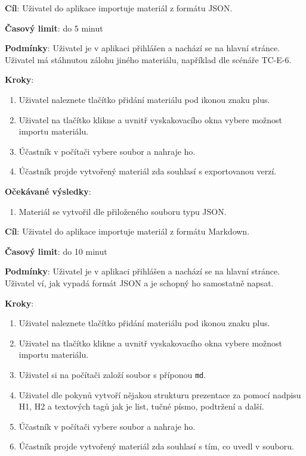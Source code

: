 \vspace{1em}

\textbf{Cíl}: Uživatel do aplikace importuje materiál z formátu JSON.

\textbf{Časový limit}: do 5 minut

\textbf{Podmínky}:  Uživatel je v aplikaci přihlášen a nachází se na hlavní stránce. Uživatel má stáhnutou zálohu jiného materiálu, například dle scénáře TC-E-6.

\textbf{Kroky}:

\begin{enumerate}[leftmargin=1.4cm]
    \item Uživatel naleznete tlačítko přidání materiálu pod ikonou znaku plus.
    \item Uživatel na tlačítko klikne a uvnitř vyskakovacího okna vybere možnost importu materiálu.
    \item Účastník v počítači vybere soubor a nahraje ho.
    \item Účastník projde vytvořený materiál zda souhlasí s exportovanou verzí.
\end{enumerate}

\textbf{Očekávané výsledky}:

\begin{enumerate}[leftmargin=1.4cm]
    \item Materiál se vytvořil dle přiloženého souboru typu JSON.
\end{enumerate}






\vspace{1em}

\textbf{Cíl}: Uživatel do aplikace importuje materiál z formátu Markdown.

\textbf{Časový limit}: do 10 minut

\textbf{Podmínky}:  Uživatel je v aplikaci přihlášen a nachází se na hlavní stránce. Uživatel ví, jak vypadá formát JSON a je schopný ho samostatně napsat.

\textbf{Kroky}:

\begin{enumerate}[leftmargin=1.4cm]
    \item Uživatel naleznete tlačítko přidání materiálu pod ikonou znaku plus.
    \item Uživatel na tlačítko klikne a uvnitř vyskakovacího okna vybere možnost importu materiálu.
    \item Uživatel si na počítači založí soubor s příponou \verb|md|.
    \item Uživatel dle pokynů vytvoří nějakou strukturu prezentace za pomocí nadpisu H1, H2 a textových tagů jak je list, tučné písmo, podtržení a další.
    \item Účastník v počítači vybere soubor a nahraje ho.
    \item Účastník projde vytvořený materiál zda souhlasí s tím, co uvedl v souboru.
\end{enumerate}

